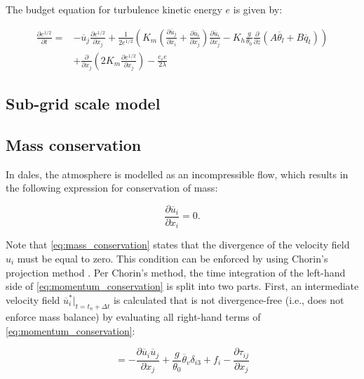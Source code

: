 The budget equation for turbulence kinetic energy $e$ is given by:

\begin{equation}
\begin{split}
    \frac{\partial e^{1/2}}{\partial t} = &- \overline{u}_j \frac{\partial e^{1/2}}{\partial x_j} + \frac{1}{2e^{1/2}} \left( K_m \left( \frac{\partial \overline{u}_j}{\partial x_i} + \frac{\partial \overline{u}_i}{\partial x_j} \right) \frac{\partial \overline{u}_i}{\partial x_j} - K_h \frac{g}{\theta_0} \frac{\partial}{\partial z} \left( A \overline{\theta}_l + B \overline{q}_t\right) \right) \\ &+ \frac{\partial}{\partial x_j} \left( 2 K_m \frac{\partial e^{1/2}}{\partial x_j}\right) - \frac{c_{\varepsilon} e}{2 \lambda}
\end{split}
\end{equation}


\subsection{Sub-grid scale model}


\subsection{Mass conservation} \label{sec:dales_poisson}
In \acrshort{dales}, the atmosphere is modelled as an incompressible flow, which results in the following expression for conservation of mass:

\begin{equation}
    \frac{\partial \overline{u}_i}{\partial x_i} = 0. \label{eq:mass_conservation}
\end{equation}

Note that \autoref{eq:mass_conservation} states that the divergence of the velocity field $u_i$ must be equal to zero. This condition can be enforced by using Chorin's projection method \citep{chorinNumericalSolutionNavierStokes1967}. Per Chorin's method, the time integration of the left-hand side of \autoref{eq:momentum_conservation} is split into two parts. First, an intermediate velocity field $\overline{u}^*_i |_{t=t_n + \Delta t}$ is calculated that is not divergence-free (i.e., does not enforce mass balance) by evaluating all right-hand terms of \autoref{eq:momentum_conservation}: 

\begin{equation}
     = - \frac{\partial \overline{u}_i \overline{u}_j}{\partial x_j} + \frac{g}{\theta_0}\overline{\theta}_v \delta_{i3} + f_i - \frac{\partial \tau_{ij}}{\partial x_j} \label{eq:chorin_step1}
\end{equation}

